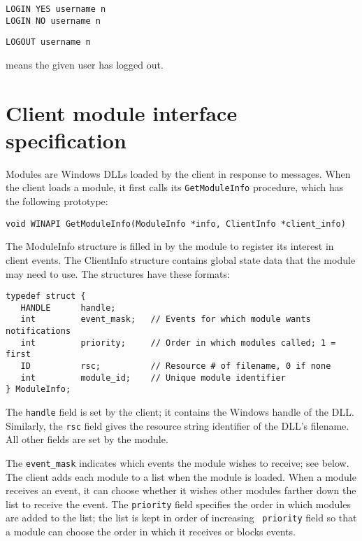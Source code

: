 \begin{verbatim}
LOGIN YES username n
LOGIN NO username n
\end{verbatim}
\tline
\begin{verbatim}
LOGOUT username n
\end{verbatim}
means the given user has logged out.




\section{Client module interface specification}

Modules are Windows DLLs loaded by the client in response to
 messages. When the client loads a module, it
first calls its {\tt GetModuleInfo} procedure, which has the following
prototype:

\begin{verbatim}
void WINAPI GetModuleInfo(ModuleInfo *info, ClientInfo *client_info)
\end{verbatim}

The ModuleInfo structure is filled in by the module to register its
interest in client events.  The ClientInfo structure contains global
state data that the module may need to use.  The structures have these
formats:

\begin{verbatim}
typedef struct {
   HANDLE      handle;
   int         event_mask;   // Events for which module wants notifications
   int         priority;     // Order in which modules called; 1 = first
   ID          rsc;          // Resource # of filename, 0 if none
   int         module_id;    // Unique module identifier
} ModuleInfo;
\end{verbatim}

The {\tt handle} field is set by the client; it contains the Windows handle
of the DLL.  Similarly, the {\tt rsc} field gives the resource string
identifier of the DLL's filename.  All other fields are set by the module.  

The {\tt event\_mask} indicates which events the module wishes to
receive; see below.  The client adds each module to a list when the
module is loaded.  When a module receives an event, it can choose
whether it wishes other modules farther down the list to receive the
event.  The {\tt priority} field specifies the order in which modules
are added to the list; the list is kept in order of increasing {\tt
priority} field so that a module can choose the order in which it
receives or blocks events.

